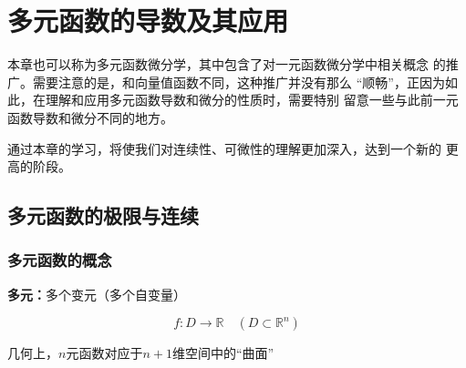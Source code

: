 \setcounter{chapter}{9}

\chapter{多元函数的导数及其应用}

本章也可以称为多元函数微分学，其中包含了对一元函数微分学中相关概念
的推广。需要注意的是，和向量值函数不同，这种推广并没有那么
“顺畅”，正因为如此，在理解和应用多元函数导数和微分的性质时，需要特别
留意一些与此前一元函数导数和微分不同的地方。

通过本章的学习，将使我们对连续性、可微性的理解更加深入，达到一个新的
更高的阶段。

\section{多元函数的极限与连续}

\subsection{多元函数的概念}

{\bf 多元：}多个变元（多个自变量）

$$f:D\to\mathbb{R}\quad(D\subset{\mathbb{R}^n})$$

几何上，$n$元函数对应于$n+1$维空间中的“曲面”


